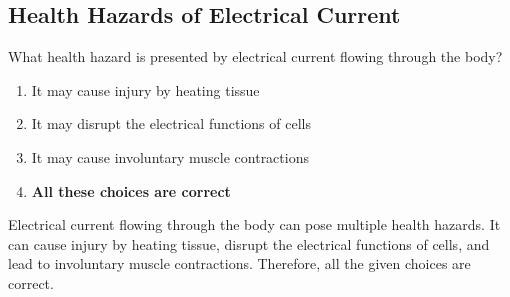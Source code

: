 \subsection{Health Hazards of Electrical Current}
\label{T0A02}

\begin{tcolorbox}[colback=gray!10!white,colframe=black!75!black,title=T0A02]
What health hazard is presented by electrical current flowing through the body?
\begin{enumerate}[noitemsep]
    \item It may cause injury by heating tissue
    \item It may disrupt the electrical functions of cells
    \item It may cause involuntary muscle contractions
    \item \textbf{All these choices are correct}
\end{enumerate}
\end{tcolorbox}

Electrical current flowing through the body can pose multiple health hazards. It can cause injury by heating tissue, disrupt the electrical functions of cells, and lead to involuntary muscle contractions. Therefore, all the given choices are correct.